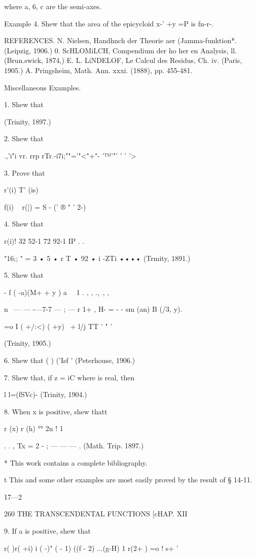 where a, 6, c are the semi-axes. 

Example 4. Shew that the area of the epicycloid x-' +y  =P is fn-r-. 

REFERENCES. 
N. Nielsen, Handhnch der Theorie aer (Jamma-funktion*. (Leipzig, 1906.) 
0. ScHLOMiLCH, Compendium der ho her en Analysis, ll. (Brun.swick, 1874,) 
E. L. LiNDELOF, Le Calcul des Residus, Ch. iv. (Paris, 1905.) 
A. Pringsheim, Math. Ann. xxxi. (1888), pp. 455-481. 

Miscellaneous Examples. 

1. Shew that 

(Trinity, 1897.) 

2. Shew that 

.,'i"i vr. rrp rTr.-i7i;""='"<"+"- '™'"' ' '  '> 

3. Prove that 

r'(i) T' (is) 

f(i) ~ r(|) =   S  - (' ® " '   2-) 

4. Shew that 

 r(i)!  32 52-1 72 92-1 IP   . . 

"16;; " = 3  • 5  • r T • 92 • i -ZTi •••• (Trmity, 1891.) 

5. Shew that 

- f ( -a)(M+  + y )     a \ \  1 . , , .,\ , , 

n \ — — -—7-7 — ; — r  1+ ,   H- = - - sm (an) B (/3, y). 

 =o I ( +/:<) ( +y) \   + l/j TT   '  " '  

(Trinity, 1905.) 

6. Shew that   ( )   ('Isf ' (Peterhouse, 1906.) 

7. Shew that, if z = iC where   is real, then 

l  l=\/(fSVc)- (Trinity, 1904.) 

8. When x is positive, shew thatt 

r (x) r (h) °° 2n ! 1 

 . . , Tx = 2 -  ; —   — — . (Math. Trip. 1897.) 

* This work contains a complete bibliography. 

t This and some other examples are most easily proved by the result of § 14-11. 

17—2 



260 THE TRANSCENDENTAL FUNCTIONS [cHAP. XII 

9. If a is positive, shew that 

r( )r( +i)   i ( -)" ( - 1) ((f - 2) ...(g-H) 1 
r(2+ )  =o  ! s+ ' 

